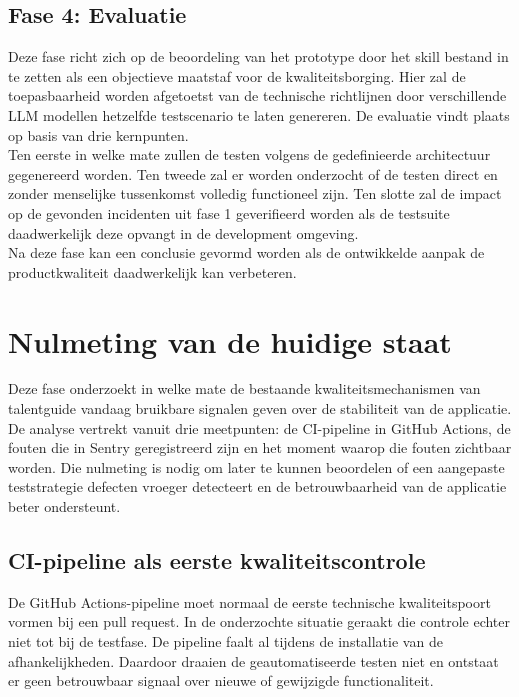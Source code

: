 \section{Fase 4: Evaluatie}
Deze fase richt zich op de beoordeling van het prototype door het skill bestand in te zetten als een objectieve maatstaf voor de kwaliteitsborging. Hier zal de toepasbaarheid worden afgetoetst van de technische richtlijnen door verschillende LLM modellen hetzelfde testscenario te laten genereren. De evaluatie vindt plaats op basis van drie kernpunten.
\bigskip
\\
Ten eerste in welke mate zullen de testen volgens de gedefinieerde architectuur gegenereerd worden. Ten tweede zal er worden onderzocht of de testen direct en zonder menselijke tussenkomst volledig functioneel zijn. Ten slotte zal de impact op de gevonden incidenten uit fase 1 geverifieerd worden als de testsuite daadwerkelijk deze opvangt in de development omgeving. 
\bigskip
\\
Na deze fase kan een conclusie gevormd worden als de ontwikkelde aanpak de productkwaliteit daadwerkelijk kan verbeteren.

\chapter{Nulmeting van de huidige staat}
\label{ch:fase1}

Deze fase onderzoekt in welke mate de bestaande kwaliteitsmechanismen van talentguide vandaag bruikbare signalen geven over de stabiliteit van de applicatie. De analyse vertrekt vanuit drie meetpunten: de CI-pipeline in GitHub Actions, de fouten die in Sentry geregistreerd zijn en het moment waarop die fouten zichtbaar worden. Die nulmeting is nodig om later te kunnen beoordelen of een aangepaste teststrategie defecten vroeger detecteert en de betrouwbaarheid van de applicatie beter ondersteunt.

\section{CI-pipeline als eerste kwaliteitscontrole}

De GitHub Actions-pipeline moet normaal de eerste technische kwaliteitspoort vormen bij een pull request. In de onderzochte situatie geraakt die controle echter niet tot bij de testfase. De pipeline faalt al tijdens de installatie van de afhankelijkheden. Daardoor draaien de geautomatiseerde testen niet en ontstaat er geen betrouwbaar signaal over nieuwe of gewijzigde functionaliteit.

